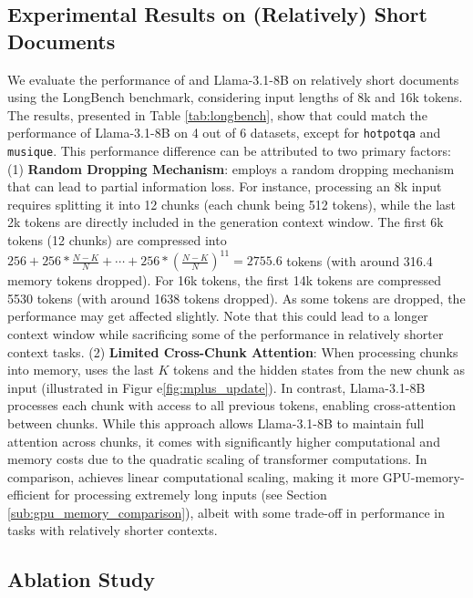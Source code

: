 \subsection{Experimental Results on (Relatively) Short Documents}
\vspace{-3pt}
We evaluate the performance of \ours and Llama-3.1-8B on relatively short documents using the LongBench benchmark, considering input lengths of 8k and 16k tokens. The results, presented in Table \ref{tab:longbench}, show that \ours could match the performance of Llama-3.1-8B on 4 out of 6 datasets, except for \texttt{hotpotqa} and \texttt{musique}.
This performance difference can be attributed to two primary factors: 
(1) \textbf{Random Dropping Mechanism}: \ours employs a random dropping mechanism that can lead to partial information loss. For instance, processing an 8k input requires splitting it into 12 chunks (each chunk being 512 tokens), while the last 2k tokens are directly included in the generation context window. The first 6k tokens (12 chunks) are compressed into $256 + 256 * \frac{N-K}{N} + \cdots + 256 * (\frac{N-K}{N})^{11} = 2755.6$ tokens (with around 316.4 memory tokens dropped). For 16k tokens, the first 14k tokens are compressed 5530 tokens (with around 1638 tokens dropped). As some tokens are dropped, the performance may get affected slightly. Note that this could lead to a longer context window while sacrificing some of the performance in relatively shorter context tasks. 
(2) \textbf{Limited Cross-Chunk Attention}: When processing chunks into memory, \ours uses the last $K$ tokens and the hidden states from the new chunk as input (illustrated in Figur e\ref{fig:mplus_update}). In contrast, Llama-3.1-8B processes each chunk with access to all previous tokens, enabling cross-attention between chunks. While this approach allows Llama-3.1-8B to maintain full attention across chunks, it comes with significantly higher computational and memory costs due to the quadratic scaling of transformer computations. In comparison, \ours achieves linear computational scaling, making it more GPU-memory-efficient for processing extremely long inputs (see Section \ref{sub:gpu_memory_comparison}), albeit with some trade-off in performance in tasks with relatively shorter contexts. 





\vspace{-5pt}
\subsection{Ablation Study}
\label{sub:ablation_study}
\vspace{-3pt}
